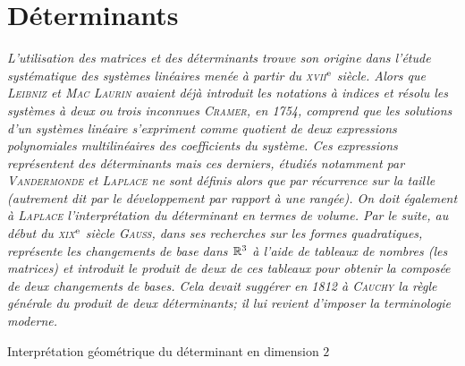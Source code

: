 \chapter{Déterminants}

\textsl{L'utilisation des matrices et des déterminants trouve son origine dans l'étude systématique des systèmes linéaires menée à partir du \textsc{xvii}$^{\mathrm{e}}$ siècle. Alors que \textsc{Leibniz} et \textsc{Mac Laurin} avaient déjà introduit les notations à indices et résolu les systèmes à deux ou trois inconnues \textsc{Cramer}, en 1754, comprend que les solutions d'un systèmes linéaire s'expriment comme quotient de deux expressions polynomiales multilinéaires des coefficients du système. Ces expressions représentent des déterminants mais ces derniers, étudiés notamment par \textsc{Vandermonde} et \textsc{Laplace} ne sont définis alors que par récurrence sur la taille (autrement dit par le développement par rapport à une rangée). On doit également à \textsc{Laplace} l'interprétation du déterminant en termes de volume. Par le suite, au début du \textsc{xix}$^{\mathrm{e}}$ siècle \textsc{Gauss}, dans ses recherches sur les formes quadratiques, représente les changements de base dans $\mathbb{R}^3$ à l'aide de tableaux de nombres (les matrices) et introduit le produit de deux de ces tableaux pour obtenir la composée de deux changements de bases. Cela devait suggérer en 1812 à \textsc{Cauchy} la règle générale du produit de deux déterminants; il lui revient d'imposer la terminologie moderne.}

\begin{marginfigure}[-8.2cm]
    \caption*{\centering Interprétation géométrique du déterminant en dimension $2$}
   
\end{marginfigure}


